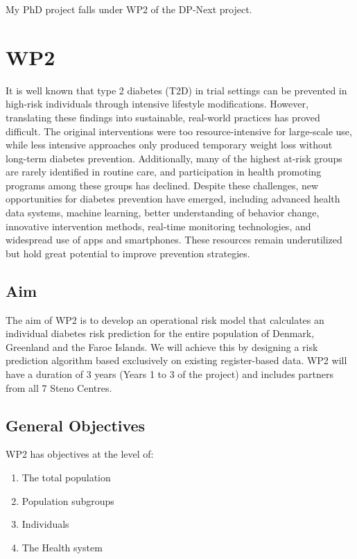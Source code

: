 \documentclass[11pt]{article}
\begin{document}
My PhD project falls under WP2 of the DP-Next project.

\section{WP2}
\label{sec:org4fc295f}
It is well known that type 2 diabetes (T2D) in trial settings can be prevented in high-risk individuals
through intensive lifestyle modifications. However, translating these findings into sustainable,
real-world practices has proved difficult. The original interventions were too resource-intensive for
large-scale use, while less intensive approaches only produced temporary weight loss without long-term
diabetes prevention. Additionally, many of the highest at-risk groups are rarely identified in routine
care, and participation in health promoting programs among these groups has declined. Despite these
challenges, new opportunities for diabetes prevention have emerged, including advanced health data
systems, machine learning, better understanding of behavior change, innovative intervention methods,
real-time monitoring technologies, and widespread use of apps and smartphones. These resources remain
underutilized but hold great potential to improve prevention strategies.

\subsection{Aim}
\label{sec:org4971358}
The aim of WP2 is to develop an operational risk model that calculates an individual diabetes risk
prediction for the entire population of Denmark, Greenland and the Faroe Islands. We will achieve this
by designing a risk prediction algorithm based exclusively on existing register-based data. WP2 will
have a duration of 3 years (Years 1 to 3 of the project) and includes partners from all 7 Steno Centres.

\subsection{General Objectives}
\label{sec:orge6d44fe}
WP2 has objectives at the level of:
\begin{enumerate}
\item The total population
\item Population subgroups
\item Individuals
\item The Health system
\end{enumerate}
\end{document}
